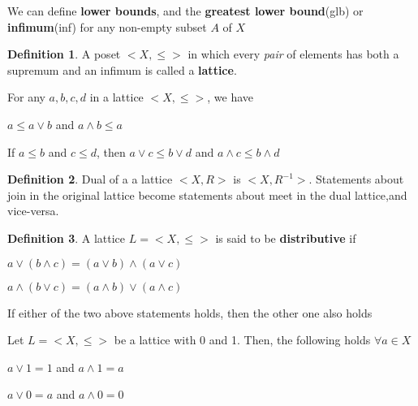 \documentclass{article}
\theoremstyle{definition}
\newtheorem*{defi}{Definition}
\theoremstyle{definition}
\newenvironment{manualprop}[1]{%
  \renewcommand\themanualpropinner{#1}%
  \manualpropinner
}{\endmanualpropinner}
\theoremstyle{named}
\begin{document}
We can define \textbf{lower bounds}, and the \textbf{greatest lower bound}(glb) or \textbf{infimum}(inf) for any non-empty subset $A$ of $X$ 


\begin{defi}
A poset $<X, \leq>$ in which every \textit{pair} of elements has both a supremum and an infimum is called a \textbf{lattice}. 
\end{defi}

\begin{manualprop}{9}
For any $a,b,c,d$ in a lattice $<X, \leq>$, we have
\begin{compactenum}
    
\item $a \leq a \vee b $  and $a \wedge b \leq a$
\item If $a \leq b$ and $c \leq d$, then $a \vee c \leq b \vee d $ and $a \wedge c \leq b \wedge d$
\end{compactenum}
\end{manualprop}

\begin{defi}
Dual of a a lattice $<X, R>$ is $<X, R^{-1}>$. Statements about join in the original lattice become statements about meet in the dual lattice,and vice-versa.
\end{defi}

\begin{defi}
A lattice $L = <X, \leq>$ is said to be \textbf{distributive} if 
  
\begin{compactenum}
    
    \item   $a \vee (b \wedge c) = (a \vee b) \wedge (a \vee c)$
    \item   $a \wedge (b \vee c) = (a \wedge b) \vee (a \wedge c)$
\end{compactenum}

\end{defi}
\begin{manualprop}{11}
If either of the two above statements holds, then the other one also holds
\end{manualprop}

\begin{manualprop}{12}
Let $L = <X, \leq>$ be a lattice with 0 and 1. Then, the following holds $\forall a \in X$
\begin{citemize}
    
    \item $a \vee 1 = 1$ and $ a \wedge 1 = a$
    \item $a \vee 0 = a$ and $ a \wedge 0 = 0$
\end{citemize}
\end{manualprop}
\end{document}
